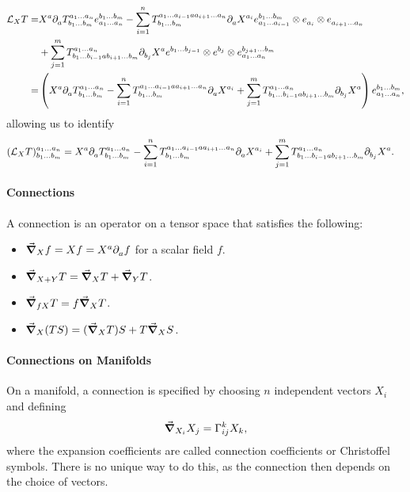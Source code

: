 \begin{align*}
	\lied{X}{T} =& X^{a}\del{}{a}{\tensor*{T}{^{a_{1}\dots a_{n}}_{b_{1}\dots b_{m}}}}\tensor*{e}{^{b_{1}\dots b_{m}}_{a_{1}\dots a_{n}}} - \sum\limits_{i = 1}^{n}\tensor*{T}{^{a_{1}\dots a_{i - 1}aa_{i + 1}\dots a_{n}}_{b_{1}\dots b_{m}}}\del{}{a}{X^{a_{i}}}\tensor*{e}{^{b_{1}\dots b_{m}}_{a_{1}\dots a_{i - 1}}}\otimes\tensor*{e}{_{a_{i}}}\otimes\tensor*{e}{_{a_{i + 1}\dots a_{n}}} \\
	             &+ \sum\limits_{j = 1}^{m}\tensor*{T}{^{a_{1}\dots a_{n}}_{b_{1}\dots b_{i - 1}ab_{i + 1}\dots b_{m}}}\del{}{b_{j}}{X^{a}}\tensor*{e}{^{b_{1}\dots b_{j - 1}}}\otimes\tensor*{e}{^{b_{j}}}\otimes\tensor*{e}{^{b_{j + 1}\dots b_{m}}_{a_{1}\dots a_{n}}} \\
	            =& \left(X^{a}\del{}{a}{\tensor*{T}{^{a_{1}\dots a_{n}}_{b_{1}\dots b_{m}}}} - \sum\limits_{i = 1}^{n}\tensor*{T}{^{a_{1}\dots a_{i - 1}aa_{i + 1}\dots a_{n}}_{b_{1}\dots b_{m}}}\del{}{a}{X^{a_{i}}} + \sum\limits_{j = 1}^{m}\tensor*{T}{^{a_{1}\dots a_{n}}_{b_{1}\dots b_{i - 1}ab_{i + 1}\dots b_{m}}}\del{}{b_{j}}{X^{a}}\right)\tensor*{e}{^{b_{1}\dots b_{m}}_{a_{1}\dots a_{n}}},
\end{align*}
allowing us to identify
\begin{align*}
	\tensor*{(\lied{X}{T})}{^{a_{1}\dots a_{n}}_{b_{1}\dots b_{m}}} &= X^{a}\del{}{a}{\tensor*{T}{^{a_{1}\dots a_{n}}_{b_{1}\dots b_{m}}}} - \sum\limits_{i = 1}^{n}\tensor*{T}{^{a_{1}\dots a_{i - 1}aa_{i + 1}\dots a_{n}}_{b_{1}\dots b_{m}}}\del{}{a}{X^{a_{i}}} + \sum\limits_{j = 1}^{m}\tensor*{T}{^{a_{1}\dots a_{n}}_{b_{1}\dots b_{i - 1}ab_{i + 1}\dots b_{m}}}\del{}{b_{j}}{X^{a}}.
\end{align*}

\paragraph{Connections}
A connection is an operator on a tensor space that satisfies the following:
\begin{itemize}
	\item $\grad_{X}{f} = Xf = X^{a}\partial^{}_{a}{f}$ for a scalar field $f$.
	\item $\grad_{X + Y}{T} = \grad_{X}{T} + \grad_{Y}{T}$.
	\item $\grad_{fX}{T} = f\grad_{X}{T}$.
	\item $\grad_{X}{(TS)} = (\grad_{X}{T})S + T\grad_{X}{S}$.
\end{itemize}

\paragraph{Connections on Manifolds}
On a manifold, a connection is specified by choosing $n$ independent vectors $X_{i}$ and defining
\begin{align*}
	\dcov{X_{i}}{X_{j}} = \chris{k}{i}{j}X_{k},
\end{align*}
where the expansion coefficients are called connection coefficients or Christoffel symbols. There is no unique way to do this, as the connection then depends on the choice of vectors.

